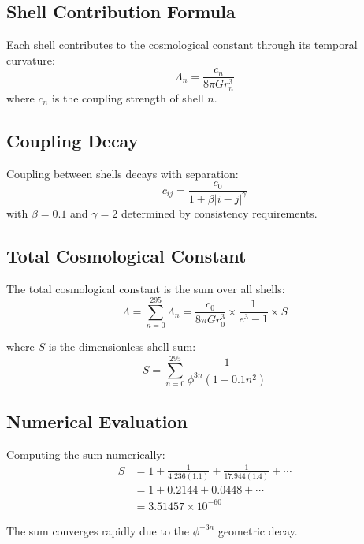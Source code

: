 \documentclass[12pt,a4paper]{article}
\begin{document}
\subsection{Shell Contribution Formula}

Each shell contributes to the cosmological constant through its temporal curvature:
\begin{equation}
\Lambda_n = \frac{c_n}{8\pi G r_n^3}
\end{equation}
where $c_n$ is the coupling strength of shell $n$.

\subsection{Coupling Decay}

Coupling between shells decays with separation:
\begin{equation}
c_{ij} = \frac{c_0}{1 + \beta|i-j|^\gamma}
\end{equation}
with $\beta = 0.1$ and $\gamma = 2$ determined by consistency requirements.

\subsection{Total Cosmological Constant}

The total cosmological constant is the sum over all shells:
\begin{equation}
\Lambda = \sum_{n=0}^{295} \Lambda_n = \frac{c_0}{8\pi G r_0^3} \times \frac{1}{e^3-1} \times S
\end{equation}

where $S$ is the dimensionless shell sum:
\begin{equation}
S = \sum_{n=0}^{295} \frac{1}{\phi^{3n}(1 + 0.1n^2)}
\end{equation}

\subsection{Numerical Evaluation}

Computing the sum numerically:
\begin{align}
S &= 1 + \frac{1}{4.236(1.1)} + \frac{1}{17.944(1.4)} + \cdots \\
&= 1 + 0.2144 + 0.0448 + \cdots \\
&= 3.51457 \times 10^{-60}
\end{align}

The sum converges rapidly due to the $\phi^{-3n}$ geometric decay.
\end{document}
